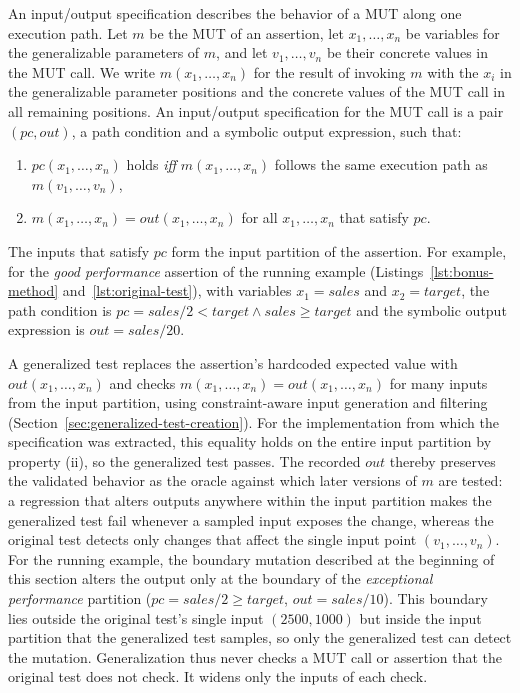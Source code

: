 

An input/output specification describes the behavior of a MUT
along one execution path.
Let $m$ be the MUT of an assertion,
let $x_1, \ldots, x_n$ be variables for the generalizable parameters of $m$,
and let $v_1, \ldots, v_n$ be their concrete values in the MUT call.
We write $m(x_1, \ldots, x_n)$ for the result of invoking $m$
with the $x_i$ in the generalizable parameter positions
and the concrete values of the MUT call in all remaining positions.
An input/output specification for the MUT call is a pair $(\mathit{pc}, \mathit{out})$,
a path condition and a symbolic output expression,
such that:
\begin{enumerate}
    \item[(i)] $\mathit{pc}(x_1, \ldots, x_n)$ holds \emph{iff}
          $m(x_1, \ldots, x_n)$ follows the same execution path
          as $m(v_1, \ldots, v_n)$,
    \item[(ii)] $m(x_1, \ldots, x_n) = \mathit{out}(x_1, \ldots, x_n)$
          for all $x_1, \ldots, x_n$ that satisfy $\mathit{pc}$.
\end{enumerate}
The inputs that satisfy $\mathit{pc}$ form the input partition of the assertion.
For example, for the \textit{good performance} assertion of the running example
(Listings~\ref{lst:bonus-method} and~\ref{lst:original-test}),
with variables $x_1 = \mathit{sales}$ and $x_2 = \mathit{target}$,
the path condition is $\mathit{pc} = \mathit{sales}/2 < \mathit{target} \land \mathit{sales} \geq \mathit{target}$
and the symbolic output expression is $\mathit{out} = \mathit{sales}/20$.

A generalized test replaces the assertion's hardcoded expected value
with $\mathit{out}(x_1, \ldots, x_n)$
and checks $m(x_1, \ldots, x_n) = \mathit{out}(x_1, \ldots, x_n)$
for many inputs from the input partition,
using constraint-aware input generation and filtering
(Section~\ref{sec:generalized-test-creation}).
For the implementation from which the specification was extracted,
this equality holds on the entire input partition by property (ii),
so the generalized test passes.
The recorded $\mathit{out}$ thereby preserves the validated behavior as the oracle
against which later versions of $m$ are tested:
a regression that alters outputs anywhere within the input partition
makes the generalized test fail whenever a sampled input exposes the change,
whereas the original test detects only changes
that affect the single input point $(v_1, \ldots, v_n)$.
For the running example, the boundary mutation described at the beginning of this section
alters the output only at the boundary of the \textit{exceptional performance} partition
($\mathit{pc} = \mathit{sales}/2 \geq \mathit{target}$, $\mathit{out} = \mathit{sales}/10$).
This boundary lies outside the original test's single input $(2500, 1000)$
but inside the input partition that the generalized test samples,
so only the generalized test can detect the mutation.
Generalization thus never checks a MUT call or assertion that the original test does not check.
It widens only the inputs of each check.

